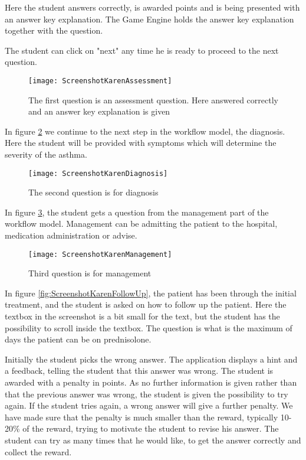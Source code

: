 Here the student answers correctly, is awarded points and is being presented with an answer key explanation. The Game Engine holds the answer key explanation together with the question. 

The student can click on "next" any time he is ready to proceed to the next question.
\begin{figure}[h!]
	\caption {The first question is an assessment question. Here answered correctly and an answer key explanation is given}
	\label{fig:ScreenshotKarenAssessment}
	\texttt{[image: ScreenshotKarenAssessment]}
\end{figure}

In figure \ref{fig:ScreenshotKarenDiagnosis} we continue to the next step in the workflow model, the diagnosis. Here the student will be provided with symptoms which will determine the severity of the asthma.
\begin{figure}[h!]
	\caption {The second question is for diagnosis}
	\label{fig:ScreenshotKarenDiagnosis}
	\texttt{[image: ScreenshotKarenDiagnosis]}
\end{figure}

In figure \ref{fig:ScreenshotKarenManagement}, the student gets a question from the management part of the workflow model. Management can be admitting the patient to the hospital, medication administration or advise.
\begin{figure}[h!]
	\caption {Third question is for management}
	\label{fig:ScreenshotKarenManagement}
	\texttt{[image: ScreenshotKarenManagement]}
\end{figure}

In figure \ref{fig:ScreenshotKarenFollowUp}, the patient has been through the initial treatment, and the student is asked on how to follow up the patient. Here the textbox in the screenshot is a bit small for the text, but the student has the possibility to scroll inside the textbox. The question is what is the maximum of days the patient can be on prednisolone.

Initially the student picks the wrong answer. The application displays a hint and a feedback, telling the student that this answer was wrong. The student is awarded with a penalty in points. As no further information is given rather than that the previous answer was wrong, the student is given the possibility to try again. If the student tries again, a wrong answer will give a further penalty. We have made sure that the penalty is much smaller than the reward, typically 10-20\% of the reward, trying to motivate the student to revise his answer. The student can try as many times that he would like, to get the answer correctly and collect the reward.

